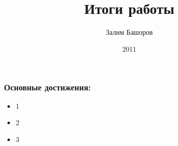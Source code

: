 \documentclass{beamer}
\title{Итоги работы}
\author{Залим Башоров}
\institute{СПбАУ}
\date{2011}
\begin{document}
\maketitle

\begin{frame}
\begin{center}
\frametitle{Основные достижения:}
\begin{itemize}
\item 1
\item 2
\item 3
\end{itemize}
\end{center}
\end{frame}
\end{document}
